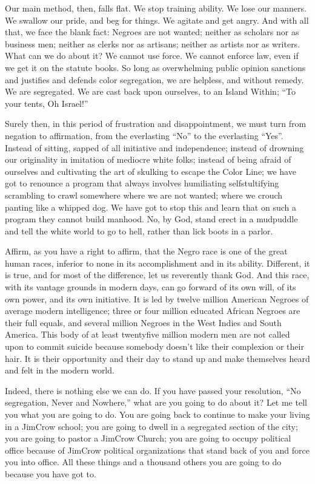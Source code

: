 \documentclass[letterpaper,10pt,english]{jupyterBook}
\begin{document}
\sphinxAtStartPar
Our main method, then, falls flat. We stop training ability. We lose our manners. We swallow our pride, and beg for things. We agitate and get angry. And with all that, we face the blank fact: Negroes are not wanted; neither as scholars nor as business men; neither as clerks nor as artisans; neither as artists nor as writers. What can we do about it? We cannot use force. We cannot enforce law, even if we get it on the statute books. So long as overwhelming public opinion sanctions and justifies and defends color segregation, we are helpless, and without remedy. We are segregated. We are cast back upon ourselves, to an Island Within; “To your tents, Oh Israel!”

\sphinxAtStartPar
Surely then, in this period of frustration and disappointment, we must turn from negation to affirmation, from the ever\sphinxhyphen{}lasting “No” to the ever\sphinxhyphen{}lasting “Yes”. Instead of sitting, sapped of all initiative and independence; instead of drowning our originality in imitation of mediocre white folks; instead of being afraid of ourselves and cultivating the art of skulking to escape the Color Line; we have got to renounce a program that always involves humiliating self\sphinxhyphen{}stultifying scrambling to crawl somewhere where we are not wanted; where we crouch panting like a whipped dog. We have got to stop this and learn that on such a program they cannot build manhood. No, by God, stand erect in a mud\sphinxhyphen{}puddle and tell the white world to go to hell, rather than lick boots in a parlor.

\sphinxAtStartPar
Affirm, as you have a right to affirm, that the Negro race is one of the great human races, inferior to none in its accomplishment and in its ability. Different, it is true, and for most of the difference, let us reverently thank God. And this race, with its vantage grounds in modern days, can go forward of its own will, of its own power, and its own initiative. It is led by twelve million American Negroes of average modern intelligence; three or four million educated African Negroes are their full equals, and several million Negroes in the West Indies and South America. This body of at least twenty\sphinxhyphen{}five million modern men are not called upon to commit suicide because somebody doesn’t like their complexion or their hair. It is their opportunity and their day to stand up and make themselves heard and felt in the modern world.

\sphinxAtStartPar
Indeed, there is nothing else we can do. If you have passed your resolution, “No segregation, Never and Nowhere,” what are you going to do about it? Let me tell you what you are going to do. You are going back to continue to make your living in a Jim\sphinxhyphen{}Crow school; you are going to dwell in a segregated section of the city; you are going to pastor a Jim\sphinxhyphen{}Crow Church; you are going to occupy political office because of Jim\sphinxhyphen{}Crow political organizations that stand back of you and force you into office. All these things and a thousand others you are going to do because you have got to.
\end{document}
